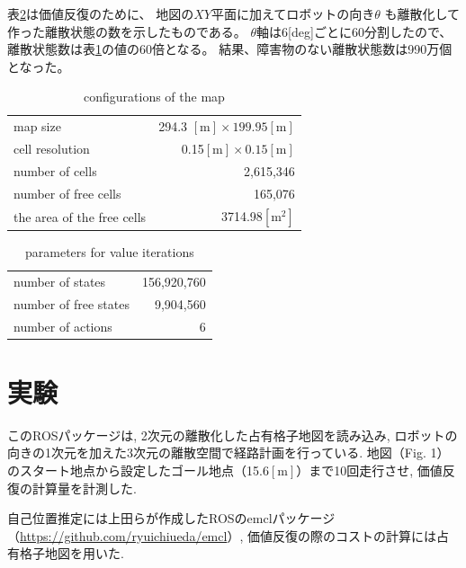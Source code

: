 \documentclass{jarticle}
\begin{document}
表\ref{table:cells}は価値反復のために、
地図の$XY$平面に加えてロボットの向き$\theta$
も離散化して作った離散状態の数を示したものである。
$\theta$軸は6[deg]ごとに60分割したので、
離散状態数は表\ref{table:map}の値の60倍となる。
結果、障害物のない離散状態数は990万個となった。

\begin{table}[bth]
  \caption{conﬁgurations of the map}
	\label{table:map}
  \centering
	\begin{small}
  \begin{tabular}{l|r}
    \hline
    map size & 294.3 $\mathrm{[m]}\times 199.95\mathrm{[m]}$\\
    cell resolution &  0.15$\mathrm{[m]}\times 0.15\mathrm{[m]}$ \\
		number of cells & 2,615,346\\
    number of free cells & 165,076\\
		the area of the free cells & 3714.98$\mathrm{[m^2]}$\\
    \hline
  \end{tabular}
	\end{small}
\end{table}

\begin{table}[bth]
	\caption{parameters for value iterations}
	\label{table:cells}
  \centering
  \begin{tabular}{l|r}
    \hline
    number of states & 156,920,760\\
    number of free states &  9,904,560\\
		number of actions & 6\\
    \hline
  \end{tabular}
\end{table}

\section{実験}%

このROSパッケージ\cite{上田rsj2021}は, 2次元の離散化した占有格子地図を読み込み, 
ロボットの向きの1次元を加えた3次元の離散空間で経路計画を行っている.
地図（Fig. 1）のスタート地点から設定したゴール地点（15.6$\mathrm{[m]}$）まで10回走行させ, 価値反復の計算量を計測した.

自己位置推定には上田らが作成したROSのemclパッケージ（\href{https://github.com/ryuichiueda/emcl}{https://github.com/ryuichiueda/emcl}）\cite{上田icra2005}, 価値反復の際のコストの計算には占有格子地図を用いた.
\end{document}
